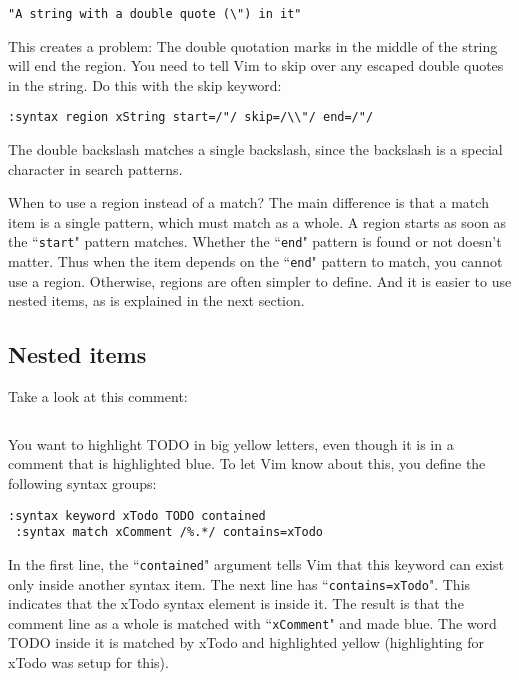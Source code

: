 \begin{Verbatim}[samepage=true]
    "A string with a double quote (\") in it"
\end{Verbatim}

This creates a problem: The double quotation marks in the middle of the string will end the region.
You need to tell Vim to skip over any escaped double quotes in the string.
Do this with the skip keyword:

\begin{Verbatim}[samepage=true]
 :syntax region xString start=/"/ skip=/\\"/ end=/"/
\end{Verbatim}

The double backslash matches a single backslash, since the backslash is a special character in search patterns.

When to use a region instead of a match?
The main difference is that a match item is a single pattern, which must match as a whole.
A region starts as soon as the ``\texttt{start}" pattern matches.
Whether the ``\texttt{end}" pattern is found or not doesn't matter.
Thus when the item depends on the ``\texttt{end}" pattern to match, you cannot use a region.
Otherwise, regions are often simpler to define.
And it is easier to use nested items, as is explained in the next section.
\subsection{Nested items}
Take a look at this comment:

\begin{Verbatim}[samepage=true]
    %Get input  TODO: Skip white space
\end{Verbatim}

You want to highlight TODO in big yellow letters, even though it is in a comment that is highlighted blue.
To let Vim know about this, you define the following syntax groups:

\begin{Verbatim}[samepage=true]
 :syntax keyword xTodo TODO contained
 :syntax match xComment /%.*/ contains=xTodo
\end{Verbatim}

In the first line, the ``\texttt{contained}" argument tells Vim that this keyword can exist only inside another syntax item.
The next line has ``\texttt{contains=xTodo}".
This indicates that the xTodo syntax element is inside it.
The result is that the comment line as a whole is matched with ``\texttt{xComment}" and made blue.
The word TODO inside it is matched by xTodo and highlighted yellow (highlighting for xTodo was setup for this).

